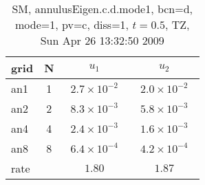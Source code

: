 \begin{table}[hbt]\tableFont %
\begin{center}
\begin{tabular}{|l|c|c|c|} \hline\hline 
grid  & N &  $u_1$ & $u_2$  \\ \hline 
                 an1 &     1 & ~$2.7\times10^{ -2}$~ & ~$2.0\times10^{ -2}$~  \\ \hline
                 an2 &     2 & ~$8.3\times10^{ -3}$~ & ~$5.8\times10^{ -3}$~  \\ \hline
                 an4 &     4 & ~$2.4\times10^{ -3}$~ & ~$1.6\times10^{ -3}$~  \\ \hline
                 an8 &     8 & ~$6.4\times10^{ -4}$~ & ~$4.2\times10^{ -4}$~  \\ \hline
    rate             &       &       $1.80$          &       $1.87$           \\ \hline\hline
\end{tabular}
\caption{SM, annulusEigen.c.d.mode1, bcn=d, mode=1, pv=c, diss=1, $t=0.5$,  TZ, Sun Apr 26 13:32:50 2009}\label{table:annulusEigen.c.d.mode1}
\end{center}
\end{table}
